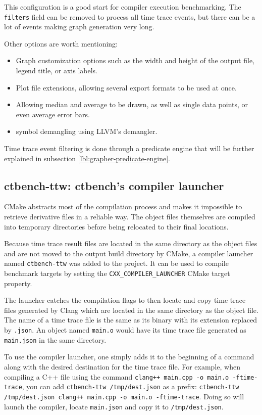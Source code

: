 \documentclass[../../main.tex]{subfiles}
\begin{document}
This configuration is a good start for compiler execution benchmarking. The
\lstinline{filters} field can be removed to process all time trace events,
but there can be a lot of events making graph generation very long.

Other options are worth mentioning:

\begin{itemize}
\item Graph customization options such as the width and height of the output
      file, legend title, or axis labels.
\item Plot file extensions, allowing several export formats to be used at once.
\item Allowing median and average to be drawn, as well as single data points,
      or even average error bars.
\item \cpp symbol demangling using LLVM's demangler.
\end{itemize}

Time trace event filtering is done through a predicate engine that will be
further explained in subsection \ref{lbl:grapher-predicate-engine}.

\subsection{ctbench-ttw: ctbench's compiler launcher}
\label{lbl:ctbench-ttw}

CMake abstracts most of the compilation process and makes it impossible to
retrieve derivative files in a reliable way. The object files themselves are
compiled into temporary directories before being relocated to their final
locations.

Because time trace result files are located in the same directory as the object
files and are not moved to the output build directory by CMake, a compiler
launcher named \lstinline{ctbench-ttw} was added to the project.
It can be used to compile benchmark targets by setting the
\lstinline{CXX_COMPILER_LAUNCHER} CMake target property.

The launcher catches the compilation flags to then locate and copy time trace
files generated by Clang which are located in the same directory as the object
file. The name of a time trace file is the same as its binary with its extension
replaced by \lstinline{.json}. An object named \lstinline{main.o} would have its
time trace file generated as \lstinline{main.json} in the same directory.

To use the compiler launcher, one simply adds it to the beginning of a command
along with the desired destination for the time trace file.
For example, when compiling a C++ file using the command
\lstinline{clang++ main.cpp -o main.o -ftime-trace}, you can add
\lstinline{ctbench-ttw /tmp/dest.json} as a prefix:
\lstinline{ctbench-ttw /tmp/dest.json clang++ main.cpp -o main.o -ftime-trace}.
Doing so will launch the compiler, locate \lstinline{main.json} and copy it to
\lstinline{/tmp/dest.json}.
\end{document}
